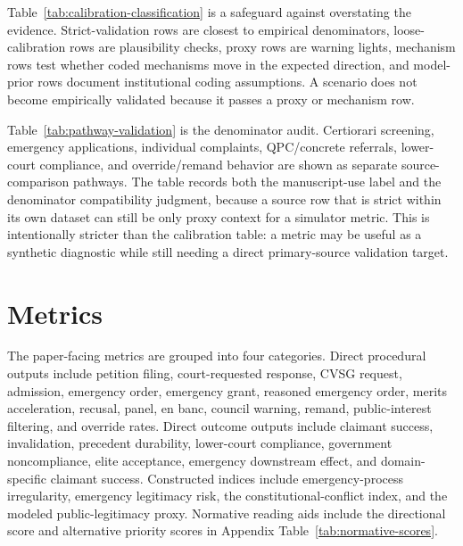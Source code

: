 \documentclass[
    journal=jlc,
    manuscript=research-article,
    year=2026,
  ]{cup-journal}
\begin{document}




Table~\ref{tab:calibration-classification} is a safeguard against overstating the evidence. Strict-validation rows are closest to empirical denominators, loose-calibration rows are plausibility checks, proxy rows are warning lights, mechanism rows test whether coded mechanisms move in the expected direction, and model-prior rows document institutional coding assumptions. A scenario does not become empirically validated because it passes a proxy or mechanism row.



Table~\ref{tab:pathway-validation} is the denominator audit. Certiorari screening, emergency applications, individual complaints, QPC/concrete referrals, lower-court compliance, and override/remand behavior are shown as separate source-comparison pathways. The table records both the manuscript-use label and the denominator compatibility judgment, because a source row that is strict within its own dataset can still be only proxy context for a simulator metric. This is intentionally stricter than the calibration table: a metric may be useful as a synthetic diagnostic while still needing a direct primary-source validation target.

\section{Metrics}

The paper-facing metrics are grouped into four categories. Direct procedural outputs include petition filing, court-requested response, CVSG request, admission, emergency order, emergency grant, reasoned emergency order, merits acceleration, recusal, panel, en banc, council warning, remand, public-interest filtering, and override rates. Direct outcome outputs include claimant success, invalidation, precedent durability, lower-court compliance, government noncompliance, elite acceptance, emergency downstream effect, and domain-specific claimant success. Constructed indices include emergency-process irregularity, emergency legitimacy risk, the constitutional-conflict index, and the modeled public-legitimacy proxy. Normative reading aids include the directional score and alternative priority scores in Appendix Table~\ref{tab:normative-scores}.
\end{document}
